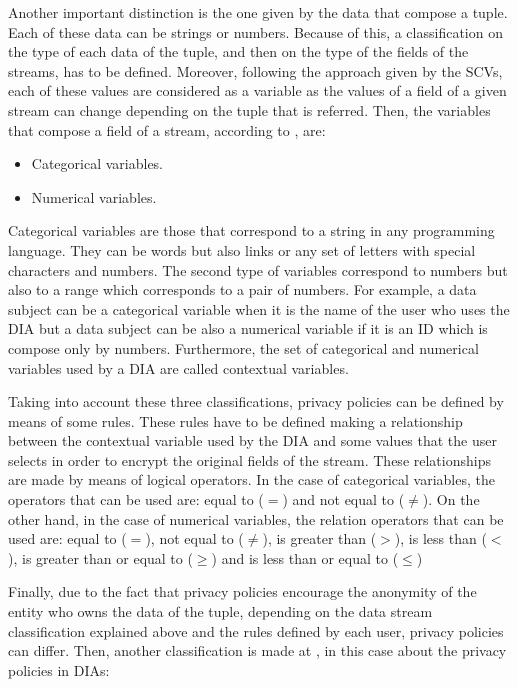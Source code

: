 Another important distinction is the one given by the data that compose a tuple. Each of these data can be strings or numbers. Because of this, a classification on the type of each data of the tuple, and then on the type of the fields of the streams, has to be defined. Moreover, following the approach given by the SCVs, each of these values are considered as a variable as the values of a field of a given stream can change depending on the tuple that is referred. Then, the variables that compose a field of a stream, according to \cite{privacypoliciesarticle}, are:

\begin{itemize}

\item Categorical variables.
\item Numerical variables.

\end{itemize}

Categorical variables are those that correspond to a string in any programming language. They can be words but also links or any set of letters with special characters and numbers. The second type of variables correspond to numbers but also to a range which corresponds to a pair of numbers. For example, a data subject can be a categorical variable when it is the name of the user who uses the DIA but a data subject can be also a numerical variable if it is an ID which is compose only by numbers. Furthermore, the set of categorical and numerical variables used by a DIA are called contextual variables.

Taking into account these three classifications, privacy policies can be defined by means of some rules. These rules have to be defined making a relationship between the contextual variable used by the DIA and some values that the user selects in order to encrypt the original fields of the stream. These relationships are made by means of logical operators. In the case of categorical variables, the operators that can be used are: equal to ($=$) and not equal to ($\neq$). On the other hand, in the case of numerical variables, the relation operators that can be used are: equal to ($=$), not equal to ($\neq$), is greater than ($>$), is less than ($<$), is greater than or equal to ($\geq$) and is less than or equal to ($\leq$)

Finally, due to the fact that privacy policies encourage the anonymity of the entity who owns the data of the tuple, depending on the data stream classification explained above and the rules defined by each user, privacy policies can differ. Then, another classification is made at \cite{privacypoliciesarticle}, in this case about the privacy policies in DIAs:

